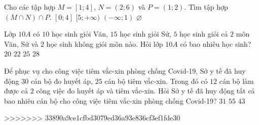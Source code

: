 \begin{ex}%
	Cho các tập hợp $M = [1; 4]$, $N = (2; 6)$ và $P = (1; 2)$. Tìm tập hợp $(M \cap N) \cap P$.
	\choice
	{$[0; 4]$}
	{$[5; + \infty  )$}
	{$(- \infty  ; 1)$}
	{\True $\varnothing $}
	\loigiai{
		Ta có $M\cap N=(2;4]\Rightarrow M\cap N\cap P=(2;4]\cap (1;2)=\varnothing$.
	}
\end{ex}
\begin{ex}%
	Lớp $10A$ có $10$ học sinh giỏi Văn, $15$ học sinh giỏi Sử, $5$ học sinh giỏi cả $2$ môn Văn, Sử và $2$ học sinh không giỏi môn nào. Hỏi lớp $10A$ có bao nhiêu học sinh?
	\choice
	{$20$ }
	{\True $22$}
	{$25$}
	{$28$}
\end{ex}
\begin{ex}%
	Để phục vụ cho công việc tiêm vắc-xin phòng chống Covid-19, Sở y tế đã huy động $30$ cán bộ đo huyết áp, $25$ cán bộ tiêm vắc-xin. Trong đó có $12$ cán bộ làm được cả $2$ công việc đo huyết áp và tiêm vắc-xin. Hỏi Sở y tế đã huy động tất cả bao nhiêu cán bộ cho công việc tiêm vắc-xin phòng chống Covid-19?
	{$31$}
	{$55$}
	{\True $43$}
\end{ex}

>>>>>>> 33890a9ce1cfbd3079ed36a93e836cf3ef1fde30

